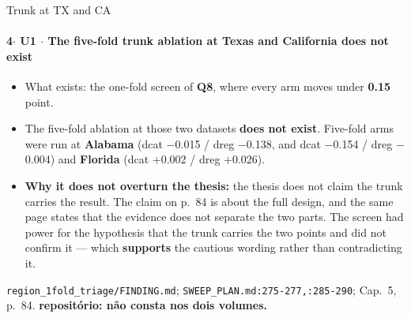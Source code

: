 \documentclass{beamer}
\begin{document}
\begin{frame}[noframenumbering]{Trunk at TX and CA}
    \framesubtitle{\normalsize 4$\cdot$ \textbf{U1} $\cdot$ The five-fold trunk ablation at Texas and California does not exist}
    \hypertarget{u1}{}
    \small
    \begin{itemize}\setlength{\itemsep}{0pt}\setlength{\parskip}{0pt}
        \item What exists: the one-fold screen of \textbf{Q8}, where every arm moves under \textbf{0.15} point.
        \item The five-fold ablation at those two datasets \textbf{does not exist}. Five-fold arms were run at \textbf{Alabama} (dcat $-$0.015 / dreg $-$0.138, and dcat $-$0.154 / dreg $-$0.004) and \textbf{Florida} (dcat $+$0.002 / dreg $+$0.026).
        \item \textbf{Why it does not overturn the thesis:} the thesis does not claim the trunk carries the result. The claim on p.~84 is about the full design, and the same page states that the evidence does not separate the two parts. The screen had power for the hypothesis that the trunk carries the two points and did not confirm it --- which \textbf{supports} the cautious wording rather than contradicting it.
    \end{itemize}
    \vfill
    {\scriptsize
    \begin{minipage}[b]{0.775\linewidth}\raggedright\textcolor{black!70}{\texttt{region\_1fold\_triage/FINDING.md}; \texttt{SWEEP\_PLAN.md:275-277,:285-290}; Cap.~5, p.~84. \textbf{repositório: não consta nos dois volumes.}}\end{minipage}\hfill
    \begin{minipage}[b]{0.20\linewidth}\raggedleft \hyperlink{q8}{}\hyperlink{b0}{}\end{minipage}}
\end{frame}
\end{document}
